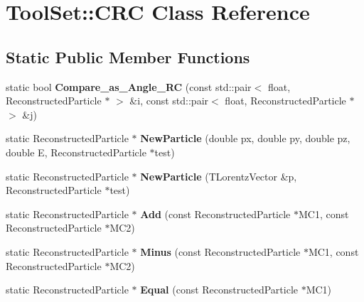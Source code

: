 \hypertarget{classToolSet_1_1CRC}{
\section{ToolSet::CRC Class Reference}
\label{classToolSet_1_1CRC}
}
\subsection*{Static Public Member Functions}
\begin{DoxyCompactItemize}
\item 
\hypertarget{classToolSet_1_1CRC_ac6bec568d1a7c6a792afd632e1538751}{
static bool {\bfseries Compare\_\-as\_\-Angle\_\-RC} (const std::pair$<$ float, ReconstructedParticle $\ast$ $>$ \&i, const std::pair$<$ float, ReconstructedParticle $\ast$ $>$ \&j)}
\label{classToolSet_1_1CRC_ac6bec568d1a7c6a792afd632e1538751}

\item 
\hypertarget{classToolSet_1_1CRC_a8d42a63101bab36be0173c2a4e101b7a}{
static ReconstructedParticle $\ast$ {\bfseries NewParticle} (double px, double py, double pz, double E, ReconstructedParticle $\ast$test)}
\label{classToolSet_1_1CRC_a8d42a63101bab36be0173c2a4e101b7a}

\item 
\hypertarget{classToolSet_1_1CRC_ac054a2fae3815f1d4a24c781491f03b2}{
static ReconstructedParticle $\ast$ {\bfseries NewParticle} (TLorentzVector \&p, ReconstructedParticle $\ast$test)}
\label{classToolSet_1_1CRC_ac054a2fae3815f1d4a24c781491f03b2}

\item 
\hypertarget{classToolSet_1_1CRC_abc862ca6ed2bb7b78c4ff26316253dec}{
static ReconstructedParticle $\ast$ {\bfseries Add} (const ReconstructedParticle $\ast$MC1, const ReconstructedParticle $\ast$MC2)}
\label{classToolSet_1_1CRC_abc862ca6ed2bb7b78c4ff26316253dec}

\item 
\hypertarget{classToolSet_1_1CRC_ac3a3e5e99a15fd8b409241d30f779663}{
static ReconstructedParticle $\ast$ {\bfseries Minus} (const ReconstructedParticle $\ast$MC1, const ReconstructedParticle $\ast$MC2)}
\label{classToolSet_1_1CRC_ac3a3e5e99a15fd8b409241d30f779663}

\item 
\hypertarget{classToolSet_1_1CRC_a19c6ca3d07dbf23e55127756f63b9020}{
static ReconstructedParticle $\ast$ {\bfseries Equal} (const ReconstructedParticle $\ast$MC1)}
\label{classToolSet_1_1CRC_a19c6ca3d07dbf23e55127756f63b9020}


\end{DoxyCompactItemize}

